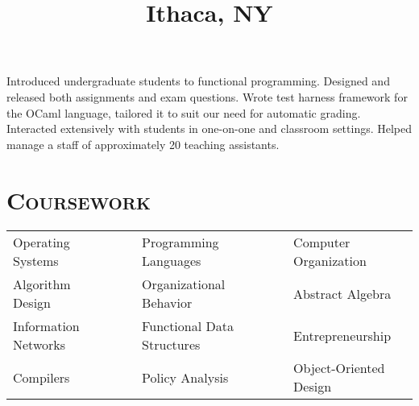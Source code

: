 \begin{resume}
\title{Ithaca, NY}
\location{}
\begin{position}
Introduced undergraduate students to functional programming.
Designed and released both assignments and exam questions. 
Wrote test harness framework for the OCaml language, tailored it to suit our need for automatic grading.
Interacted extensively with students in one-on-one and classroom settings.
Helped manage a staff of approximately 20 teaching assistants.
\end{position}




\vspace{1.00cm}

\renewcommand*\arraystretch{1.2}
\section{\textsc{Coursework}}
 \begin{tabular}{lllll}
 Operating Systems      & \ \ & Programming Languages           & \ \ & Computer Organization \\
 Algorithm Design      & \ \ & Organizational Behavior       & \ \ & Abstract Algebra    \\
 Information Networks     & \ \ & Functional Data Structures       & \ \ &  Entrepreneurship       \\
 Compilers      & \ \ &  Policy Analysis   & \ \ & Object-Oriented Design   \\
 \end{tabular}\\


\end{resume}
